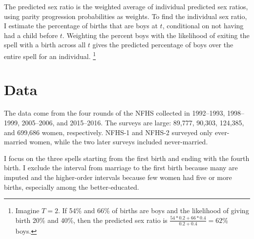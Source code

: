 \documentclass[12pt,letterpaper]{article}
\begin{document}


The predicted sex ratio is the weighted average of individual predicted sex ratios, using 
parity progression probabilities as weights.
To find the individual sex ratio, I estimate the percentage of births that are boys at $t$, 
conditional on not having had a child before $t$.
Weighting the percent boys with the likelihood of exiting the spell with a birth across all 
$t$ gives the predicted percentage of boys over the entire spell for an individual.%
\footnote{
Imagine $T=2$. 
If 54\% and 66\% of births are boys and the likelihood of giving birth 20\% and 40\%, 
then the predicted sex ratio is $\frac{54*0.2+66*0.4}{0.2+0.4} = 62$\% boys. 
}



\section{Data\label{sec:data}}

The data come from the four rounds of the NFHS
collected in 1992--1993, 1998--1999, 2005--2006, and 2015--2016.
The surveys are large: 89,777, 90,303, 124,385, and 699,686 women, respectively. 
NFHS-1 and NFHS-2 surveyed only ever-married women, while the two later surveys included 
never-married.

I focus on the three spells starting from the first birth and ending with the 
fourth birth.
I exclude the interval from marriage to the first birth because many are imputed and the
higher-order intervals because few women had five or more births, especially among the 
better-educated.
\end{document}
